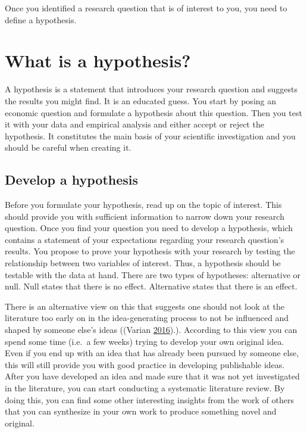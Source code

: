 \documentclass[
]{book}
\begin{document}
Once you identified a research question that is of interest to you, you
need to define a hypothesis.

\hypertarget{what-is-a-hypothesis}{%
\section{What is a hypothesis?}\label{what-is-a-hypothesis}}

A hypothesis is a statement that introduces your research question and
suggests the results you might find. It is an educated guess. You start
by posing an economic question and formulate a hypothesis about this
question. Then you test it with your data and empirical analysis and
either accept or reject the hypothesis. It constitutes the main basis of
your scientific investigation and you should be careful when creating
it.

\hypertarget{develop-a-hypothesis}{%
\subsection{Develop a hypothesis}\label{develop-a-hypothesis}}

Before you formulate your hypothesis, read up on the topic of interest.
This should provide you with sufficient information to narrow down your
research question. Once you find your question you need to develop a
hypothesis, which contains a statement of your expectations regarding
your research question's results. You propose to prove your hypothesis
with your research by testing the relationship between two variables of
interest. Thus, a hypothesis should be testable with the data at hand.
There are two types of hypotheses: alternative or null. Null states that
there is no effect. Alternative states that there is an effect.

There is an alternative view on this that suggests one should not look
at the literature too early on in the idea-generating process to not be
influenced and shaped by someone else's ideas ((Varian
\protect\hyperlink{ref-varian_how_2016}{2016}).). According to this view
you can spend some time (i.e.~a few weeks) trying to develop your own
original idea. Even if you end up with an idea that has already been
pursued by someone else, this will still provide you with good practice
in developing publishable ideas. After you have developed an idea and
made sure that it was not yet investigated in the literature, you can
start conducting a systematic literature review. By doing this, you can
find some other interesting insights from the work of others that you
can synthesize in your own work to produce something novel and original.
\end{document}
